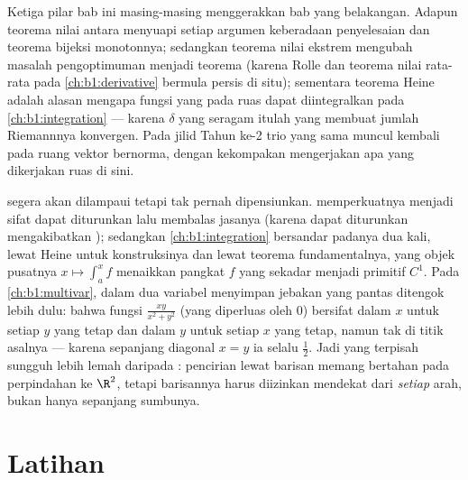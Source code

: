 \begin{remark}
Ketiga pilar bab ini masing-masing menggerakkan bab yang belakangan. Adapun
teorema nilai antara menyuapi setiap argumen keberadaan penyelesaian
dan teorema bijeksi monotonnya; sedangkan teorema nilai
ekstrem mengubah masalah pengoptimuman menjadi teorema (karena Rolle dan
teorema nilai rata-rata pada \cref{ch:b1:derivative} bermula persis
di situ); sementara teorema Heine adalah alasan mengapa fungsi yang  pada
ruas dapat diintegralkan pada \cref{ch:b1:integration} --- karena
$\delta$ yang seragam itulah yang membuat jumlah Riemannnya konvergen. Pada jilid Tahun
ke-2 trio yang sama muncul kembali pada ruang vektor bernorma, dengan
kekompakan mengerjakan apa yang dikerjakan ruas di sini.
\end{remark}

\begin{remark}
 segera akan dilampaui tetapi tak pernah dipensiunkan.
 memperkuatnya menjadi sifat dapat diturunkan lalu
membalas jasanya (karena dapat diturunkan mengakibatkan ); sedangkan
\cref{ch:b1:integration} bersandar padanya dua kali, lewat Heine untuk
konstruksinya dan lewat teorema fundamentalnya, yang objek
pusatnya $x \mapsto \int_a^x f$ menaikkan pangkat $f$ yang sekadar
 menjadi primitif $C^1$. Pada
\cref{ch:b1:multivar},  dalam dua variabel menyimpan jebakan
yang pantas ditengok lebih dulu: bahwa fungsi $\frac{xy}{x^2 + y^2}$ (yang diperluas
oleh $0$) bersifat  dalam $x$ untuk setiap $y$ yang tetap dan dalam $y$ untuk
setiap $x$ yang tetap, namun tak  di titik asalnya --- karena sepanjang
diagonal $x = y$ ia selalu $\frac12$. Jadi  yang terpisah
sungguh lebih lemah daripada : pencirian lewat
barisan memang bertahan pada perpindahan ke $\R^2$, tetapi barisannya harus
diizinkan mendekat dari \emph{setiap} arah, bukan hanya
sepanjang sumbunya.
\end{remark}

\section{Latihan}

